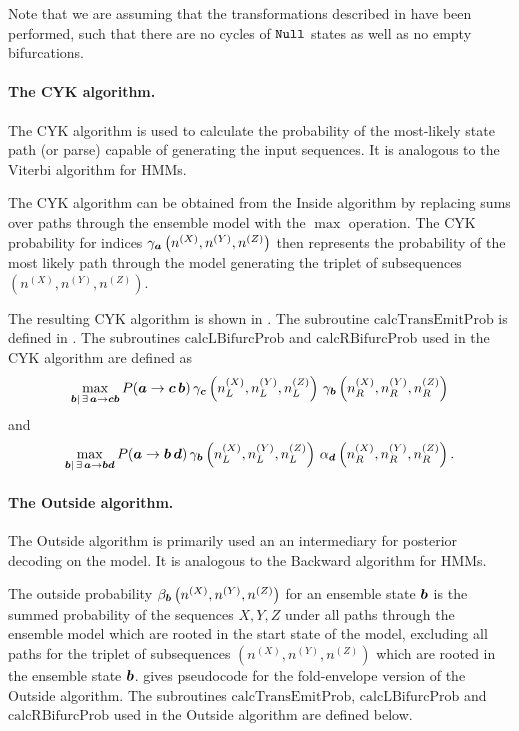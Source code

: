 \documentclass[10pt]{article}
\begin{document}
Note that we are assuming that the transformations described in  have been performed, such that there are no cycles of $\mathtt{Null}$ states as well as no empty bifurcations.


\paragraph{The CYK algorithm.}
The CYK algorithm is used to calculate the probability of the
most-likely state path (or parse) capable of generating the input
sequences.  It is analogous to the Viterbi algorithm for HMMs.

The CYK algorithm can be obtained from the Inside algorithm by replacing sums over paths through the ensemble model
with the $\max$ operation.
The CYK probability for indices $\gamma_{\boldsymbol{a}} \left(n^{(X)}, n^{(Y)}, n^{(Z)}\right)$ then represents
the probability of the most likely path through the model generating 
the triplet of subsequences $\left( n^{(X)}, n^{(Y)}, n^{(Z)} \right)$.

The resulting CYK algorithm is shown in .
The subroutine $\mathrm{calcTransEmitProb}$ is defined in .  The subroutines $\mathrm{calcLBifurcProb}$ and $\mathrm{calcRBifurcProb}$
used in the CYK algorithm are defined as 
\[ \max_{\boldsymbol{b}|\,\exists\, \boldsymbol{a}\to\boldsymbol{c}\boldsymbol{b}} P (\boldsymbol{a}\to\boldsymbol{c}\,\boldsymbol{b}) \, \gamma_{\boldsymbol{c}}\left( n^{(X)}_L,n^{(Y)}_L,n^{(Z)}_L\right) \, \gamma_{\boldsymbol{b}}\left( n^{(X)}_R,n^{(Y)}_R,n^{(Z)}_R\right) \]
and
\[ \max_{\boldsymbol{b}|\,\exists\, \boldsymbol{a}\to\boldsymbol{b}\boldsymbol{d}} P (\boldsymbol{a}\to\boldsymbol{b}\,\boldsymbol{d}) \, \gamma_{\boldsymbol{b}}\left( n^{(X)}_L,n^{(Y)}_L,n^{(Z)}_L\right) \, \alpha_{\boldsymbol{d}}\left( n^{(X)}_R,n^{(Y)}_R,n^{(Z)}_R\right) . \]


\paragraph{The Outside algorithm.}
The Outside algorithm is primarily used an an intermediary for posterior decoding on the model.  It is analogous to the Backward algorithm for HMMs.

The outside probability $\beta_{\boldsymbol{b}} \left( n^{(X)}, n^{(Y)}, n^{(Z)}\right)$ for an ensemble state $\boldsymbol{b}$
is the summed probability of the sequences $X, Y, Z$
under all paths through the ensemble model which are rooted in the start state of the model, excluding all paths for the triplet of subsequences $\left( n^{(X)}, n^{(Y)}, n^{(Z)} \right)$
which are rooted in the ensemble state $\boldsymbol{b}$.
 gives pseudocode for the fold-envelope version of the Outside algorithm.
The subroutines $\mathrm{calcTransEmitProb}$, $\mathrm{calcLBifurcProb}$ and $\mathrm{calcRBifurcProb}$
used in the Outside algorithm are defined below.
\end{document}
